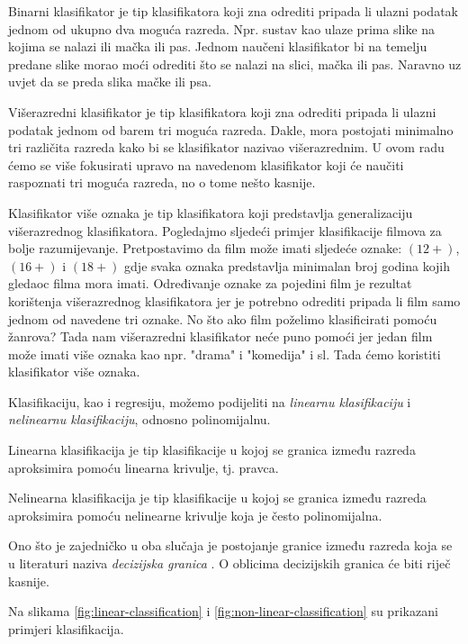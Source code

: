 \documentclass[times, utf8, zavrsni]{fer}
\begin{document}
Binarni klasifikator  je tip klasifikatora koji zna odrediti pripada li ulazni podatak jednom od ukupno dva moguća razreda. Npr. sustav kao ulaze prima slike na kojima se nalazi ili mačka ili pas. Jednom naučeni klasifikator bi na temelju predane slike morao moći odrediti što se nalazi na slici, mačka ili pas. Naravno uz uvjet da se preda slika mačke ili psa.

Višerazredni klasifikator  je tip klasifikatora koji zna odrediti pripada li ulazni podatak jednom od barem tri moguća razreda. Dakle, mora postojati minimalno tri različita razreda kako bi se klasifikator nazivao višerazrednim. U ovom radu ćemo se više fokusirati upravo na navedenom klasifikator koji će naučiti raspoznati tri moguća razreda, no o tome nešto kasnije.

Klasifikator više oznaka  je tip klasifikatora koji predstavlja generalizaciju višerazrednog klasifikatora. Pogledajmo sljedeći primjer klasifikacije filmova za bolje razumijevanje. Pretpostavimo da film može imati sljedeće oznake: $(12+)$, $(16+)$ i $(18+)$ gdje svaka oznaka predstavlja minimalan broj godina kojih gledaoc filma mora imati. Određivanje oznake za pojedini film je rezultat korištenja višerazrednog klasifikatora jer je potrebno odrediti pripada li film samo jednom od navedene tri oznake. No što ako film poželimo klasificirati pomoću žanrova? Tada nam višerazredni klasifikator neće puno pomoći jer jedan film može imati više oznaka kao npr. "drama" i "komedija" i sl. Tada ćemo koristiti klasifikator više oznaka.

\bigskip

Klasifikaciju, kao i regresiju, možemo podijeliti na \textit{linearnu klasifikaciju} i \textit{nelinearnu klasifikaciju}, odnosno polinomijalnu.

Linearna klasifikacija  je tip klasifikacije u kojoj se granica između razreda aproksimira pomoću linearna krivulje, tj. pravca.

Nelinearna klasifikacija  je tip klasifikacije u kojoj se granica između razreda aproksimira pomoću nelinearne krivulje koja je često polinomijalna.

Ono što je zajedničko u oba slučaja je postojanje granice između razreda koja se u literaturi naziva \textit{decizijska granica} \citep{cupicANN}. O oblicima decizijskih granica će biti riječ kasnije.

Na slikama \ref{fig:linear-classification} i \ref{fig:non-linear-classification} su prikazani primjeri klasifikacija.
\end{document}
